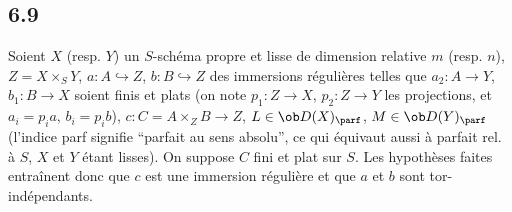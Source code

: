 \subsection*{6.9}

Soient $X$ (resp. $Y$) un $S$-schéma propre et lisse de dimension relative $m$ (resp. $n$), $Z=X\times_S Y$, $a:A\hookrightarrow Z$, $b:B\hookrightarrow Z$ des immersions régulières telles que $a_2:A\to Y$, $b_1:B\to X$ soient finis et plats (on note $p_1:Z\to X$, $p_2:Z\to Y$ les projections, et $a_i=p_i a$, $b_i=p_i b$), $c:C=A\times_Z B\to Z$, $L\in\ob D(X)_{\parf}$, $M\in\ob D(Y)_{\parf}$ (l'indice parf signifie ``parfait au sens absolu'', ce qui équivaut aussi à parfait rel. à $S$, $X$ et $Y$ étant lisses). On suppose $C$ fini et plat sur $S$. Les hypothèses faites entraînent donc que $c$ est une immersion régulière et que $a$ et $b$ sont tor-indépendants.

